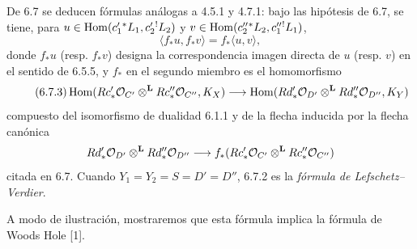 De 6.7 se deducen fórmulas análogas a 4.5.1 y 4.7.1: bajo las hipótesis de 6.7, se tiene, para $u\in\operatorname{Hom}(c_1'{}^*L_1,c_2'{}^!L_2)$ y $v\in\operatorname{Hom}(c_2''{}^*L_2,c_1''{}^!L_1)$,
\begin{equation}
\tag{6.7.2}
\langle f_*u,f_*v\rangle=f_*\langle u,v\rangle,
\end{equation}
donde $f_*u$ (resp. $f_*v$) designa la correspondencia imagen directa de $u$ (resp. $v$) en el sentido de 6.5.5, y $f_*$ en el segundo miembro es el homomorfismo
\begin{equation}
\tag{6.7.3}
\operatorname{Hom}(Rc'_*\mathcal{O}_{C'}\otimes^{\mathbf L}Rc''_*\mathcal{O}_{C''},K_X)
\longrightarrow
\operatorname{Hom}(Rd'_*\mathcal{O}_{D'}\otimes^{\mathbf L}Rd''_*\mathcal{O}_{D''},K_Y)
\end{equation}
compuesto del isomorfismo de dualidad 6.1.1 y de la flecha inducida por la flecha canónica
\[
Rd'_*\mathcal{O}_{D'}\otimes^{\mathbf L}Rd''_*\mathcal{O}_{D''}\longrightarrow f_*(Rc'_*\mathcal{O}_{C'}\otimes^{\mathbf L}Rc''_*\mathcal{O}_{C''})
\]
citada en 6.7. Cuando $Y_1=Y_2=S=D'=D''$, 6.7.2 es la \emph{fórmula de Lefschetz--Verdier}.

A modo de ilustración, mostraremos que esta fórmula implica la fórmula de Woods Hole [1].
